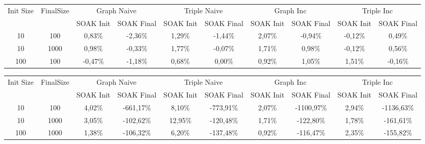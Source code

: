 \begin{sidewaystable}
	\centering
	\scriptsize
	\begin{tabular}{c|c|cc|cc|cc|cc|} %
	  	\hline
		Init Size&FinalSize &\multicolumn{2}{c}{Graph Naive}  &\multicolumn{2}{c}{Triple Naive}&\multicolumn{2}{c}{Graph Inc}  &\multicolumn{2}{c}{Triple Inc}\\\
		&& SOAK Init & SOAK Final& SOAK Init & SOAK Final& SOAK Init & SOAK Final& SOAK Init & SOAK Final\\
		\hline
		\hline
		10&100&0,83\%&	-2,36\%&	1,29\%&	-1,44\%&	2,07\%&	-0,94\%&	-0,12\%&	0,49\%\\	
		10&1000&0,98\%&	-0,33\%&	1,77\%&	-0,07\%&	1,71\%&	0,98\%&	-0,12\%&	0,56\%\\
	
		100&100&	-0,47\%&	-1,18\%&	0,68\%&	0,00\%&	0,92\%&	1,05\%&	1,51\%&	-0,16\%\\
		\hline %
	\end{tabular}
	\caption[\textsc{Analyser} Investigation Stack - Level 1 - SOAK Test Average Latency Comparison]{Mean Latency Comparison Step Response}

	\label{tab:soak_latency_comparisons}	

	\centering
	\scriptsize
	\begin{tabular}{c|c|cc|cc|cc|cc|} %
	  	\hline
		Init Size&FinalSize &\multicolumn{2}{c}{Graph Naive}  &\multicolumn{2}{c}{Triple Naive}&\multicolumn{2}{c}{Graph Inc}  &\multicolumn{2}{c}{Triple Inc}\\\
		&& SOAK Init & SOAK Final& SOAK Init & SOAK Final& SOAK Init & SOAK Final& SOAK Init & SOAK Final\\
		\hline
		\hline
		10	&100	&4,02\%&	-661,17\%&	8,10\%&	-773,91\%&	2,07\%&	-1100,97\%&	2,94\%&	-1136,63\%\\	
		10	&1000	&3,05\%&	-102,62\%&	12,95\%&	-120,48\%&	1,71\%&	-122,80\%&	1,78\%&	-161,61\%	\\
		100	&1000&	1,38\%&	-106,32\%&	6,20\%&	-137,48\%&	0,92\%&	-116,47\%&	2,35\%&	-155,82\%	\\

		\hline %
	\end{tabular}
	\caption[\textsc{Analyser} Investigation Stack - Level 1 - SOAK Test Average Latency Comparison]{Max Latency Comparison Step Response}

	\label{tab:soak_latency_comparisons}	
\end{sidewaystable}